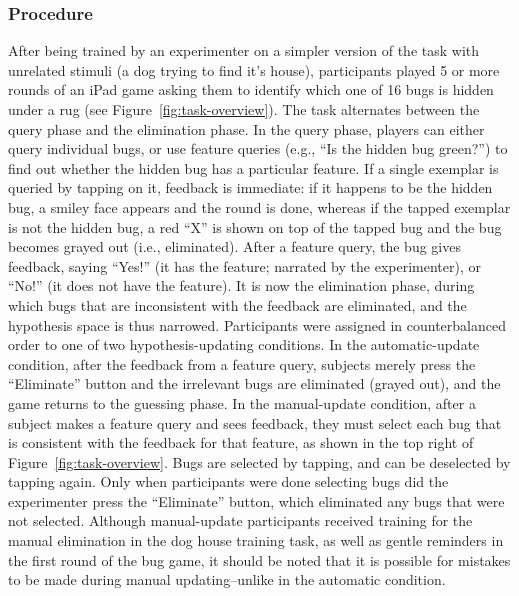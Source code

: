 \documentclass[10pt,letterpaper]{article}
\begin{document}
\subsubsection{Procedure}

After being trained by an experimenter on a simpler version of the task with unrelated stimuli (a dog trying to find it's house), participants played 5 or more rounds of an iPad game asking them to identify which one of 16 bugs is hidden under a rug (see Figure~\ref{fig:task-overview}). The task alternates between the query phase and the elimination phase. In the query phase, players can either query individual bugs, or use feature queries (e.g., ``Is the hidden bug green?'') to find out whether the hidden bug has a particular feature. If a single exemplar is queried by tapping on it, feedback is immediate: if it happens to be the hidden bug, a smiley face appears and the round is done, whereas if the tapped exemplar is not the hidden bug, a red ``X'' is shown on top of the tapped bug and the bug becomes grayed out (i.e., eliminated). After a feature query, the bug gives feedback, saying ``Yes!'' (it has the feature; narrated by the experimenter), or ``No!'' (it does not have the feature). It is now the elimination phase, during which bugs that are inconsistent with the feedback are eliminated, and the hypothesis space is thus narrowed. Participants were assigned in counterbalanced order to one of two hypothesis-updating conditions. In the automatic-update condition, after the feedback from a feature query, subjects merely press the ``Eliminate'' button and the irrelevant bugs are eliminated (grayed out), and the game returns to the guessing phase. In the manual-update condition, after a subject makes a feature query and sees feedback, they must select each bug that is consistent with the feedback for that feature, as shown in the top right of Figure~\ref{fig:task-overview}. Bugs are selected by tapping, and can be deselected by tapping again. Only when participants were done selecting bugs did the experimenter press the ``Eliminate'' button, which eliminated any bugs that were not selected. Although manual-update participants received training for the manual elimination in the dog house training task, as well as gentle reminders in the first round of the bug game, it should be noted that it is possible for mistakes to be made during manual updating--unlike in the automatic condition.
\end{document}
